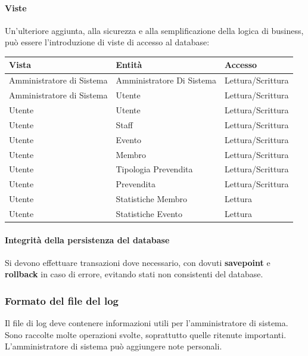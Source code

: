 \documentclass[a4paper]{article}
\begin{document}
\paragraph{Viste} Un'ulteriore aggiunta, alla sicurezza e alla semplificazione della logica di business, può essere l'introduzione di viste di accesso al database:

\begin{center}
    \begin{tabularx}{1\textwidth}{|X|X|X|}
        \hline
        \textbf{Vista} & \textbf{Entità} & \textbf{Accesso}\\
        \hline
        \hline
        Amministratore di Sistema & Amministratore Di Sistema & Lettura/Scrittura\\
        Amministratore di Sistema & Utente & Lettura/Scrittura\\
        Utente & Utente & Lettura/Scrittura\\
        Utente & Staff & Lettura/Scrittura\\
        Utente & Evento & Lettura/Scrittura\\
        Utente & Membro & Lettura/Scrittura\\
        Utente & Tipologia Prevendita & Lettura/Scrittura\\
        Utente & Prevendita & Lettura/Scrittura\\
        Utente & Statistiche Membro & Lettura\\
        Utente & Statistiche Evento & Lettura\\
        \hline
    \end{tabularx}
\end{center}

\paragraph{Integrità della persistenza del database} Si devono effettuare transazioni dove necessario, con dovuti \textbf{savepoint} e \textbf{rollback} in caso di errore, evitando stati non consistenti del database.

\subsubsection{Formato del file del log}

Il file di log deve contenere informazioni utili per l'amministratore di sistema. Sono raccolte molte operazioni svolte, soprattutto quelle ritenute importanti. L'amministratore di sistema può aggiungere note personali.
\end{document}
